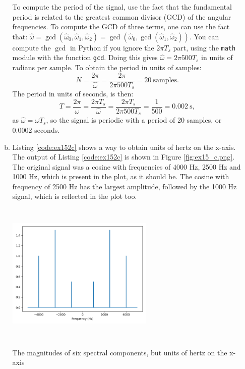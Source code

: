 \begin{enumerate}
\begin{enumerate}[a)]
                To compute the period of the signal, use the fact that the fundamental period is related 
                to the greatest common divisor (GCD) of the angular frequencies. To compute the GCD 
                of three terms, one can use the fact that: 
                $\hat{\omega}=\gcd(\hat{\omega}_{0},\hat{\omega}_{1},\hat{\omega}_{2})=\gcd(\hat{\omega}_{0},\gcd(\hat{\omega}_{1},\hat{\omega}_{2}))$. You can compute the $\gcd$ in Python if you ignore the $2\pi T_{s}$ part, using the \verb|math| module with the function \verb|gcd|. Doing this gives $\hat{\omega}=2\pi500T_{s}$ in units of radians per sample. To obtain the period in units of samples:
                \[ N=\frac{2\pi}{\hat{\omega}}=\frac{2\pi}{2\pi500T_{s}}=20 \ \mathrm{samples}. \]
                The period in units of seconds, is then:
                \[ T=\frac{2\pi}{\omega}=\frac{2\pi T_{s}}{\hat{\omega}}=\frac{2\pi T_{s}}{2\pi500T_{s}}=\frac{1}{500}=0.002 \ \mathrm{s}, \]
                as $\hat{\omega}=\omega T_{s}$, so the signal is periodic with a period of 20 samples, or 0.0002 seconds.

          \item Listing \ref{code:ex152c} shows a way to obtain units of hertz on the x-axis. 
                The output of Listing \ref{code:ex152c} is shown in Figure \ref{fig:ex15_c.png}.
                The original signal was a cosine with frequencies of 4000 Hz, 2500 Hz and 1000 Hz, which
                is present in the plot, as it should be. The cosine with frequency of 2500 Hz has the 
                largest amplitude, followed by the 1000 Hz signal, which is reflected in the plot too.
                

                \begin{marginfigure}
                  \includegraphics[width=7.0cm, height=6.8cm]{ch15/figures/ex15_c.png}
                  \caption{The magnitudes of six spectral components, but units of hertz on the x-axis}
                  \label{fig:ex15_c.png}
                \end{marginfigure}

        \end{enumerate}



\end{enumerate}
